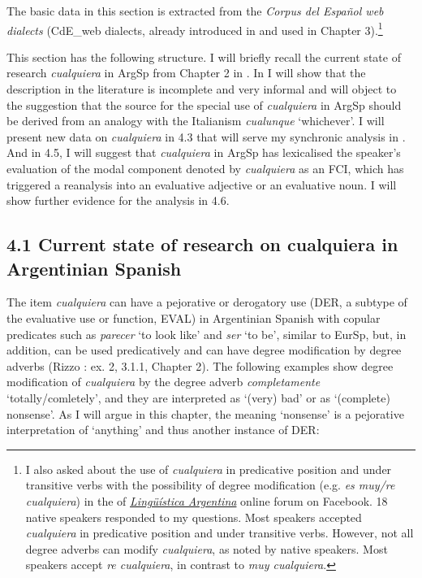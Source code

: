 \documentclass[output=paper]{langscibook}
\begin{document}
  The basic data in this section is extracted from the \textit{Corpus del Español web dialects} (CdE\_web dialects, already introduced in  and used in Chapter 3).\footnote{\textrm{I also asked about the use of} \textrm{\textit{cualquiera}} \textrm{in predicative position and under transitive verbs with the possibility of degree modification (e.g.} \textrm{\textit{es muy/re cualquiera}}\textrm{) in the of} \href{https://www.facebook.com/groups/686284488187168/permalink/992126550936292/}{{\textrm{\textit{Lingüística Argentina}}}} \textrm{online forum on Facebook}. \textrm{18 native speakers responded to my questions. Most speakers accepted} \textrm{\textit{cualquiera}} \textrm{in predicative position and under transitive verbs. However, not all degree adverbs can modify} \textrm{\textit{cualquiera}}\textrm{, as noted by native speakers. Most speakers accept} \textrm{\textit{re cualquiera}}\textrm{, in contrast to} \textrm{\textit{muy cualquiera}}.}

  This section has the following structure. I will briefly recall the current state of research \textit{cualquiera} in ArgSp from Chapter 2 in . In  I will show that the description in the literature is incomplete and very informal and will object to the suggestion that the source for the special use of \textit{cualquiera} in ArgSp should be derived from an analogy with the Italianism \textit{cualunque} ‘whichever’. I will present new data on \textit{cualquiera} in 4.3 that will serve my synchronic analysis in . And in 4.5, I will suggest that \textit{cualquiera} in ArgSp has lexicalised the speaker’s evaluation of the modal component denoted by \textit{cualquiera} as an FCI, which has triggered a reanalysis into an evaluative adjective or an evaluative noun. I will show further evidence for the analysis in 4.6. 

\subsection{\textbf{4.1} \textbf{Current} \textbf{state} \textbf{of} \textbf{research} \textbf{on \textbf{cualquiera}} \textbf{in} \textbf{Argentinian} \textbf{Spanish}}

The item \textit{cualquiera} can have a pejorative or derogatory use (DER, a subtype of the evaluative use or function, EVAL) in Argentinian Spanish with copular predicates such as \textit{parecer} ‘to look like’ and \textit{ser} ‘to be’, similar to EurSp, but, in addition, can be used predicatively and can have degree modification by degree adverbs (Rizzo \citealt{Salierno2013}: ex. 2, 3.1.1, Chapter 2). The following examples show degree modification of \textit{cualquiera} by the degree adverb \textit{completamente} ‘totally/comletely’, and they are interpreted as ‘(very) bad’ or as ‘(complete) nonsense’. As I will argue in this chapter, the meaning ‘nonsense’ is a pejorative interpretation of ‘anything’ and thus another instance of DER:
\end{document}
